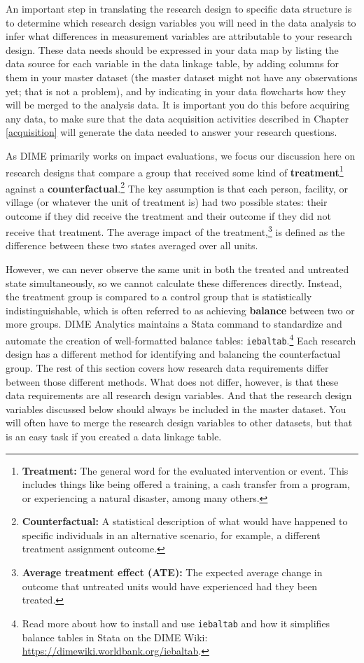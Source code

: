 \documentclass[
]{book}
\begin{document}
An important step in translating the research design to specific data
structure is to determine which research design variables you will need in the data analysis
to infer what differences in measurement variables
are attributable to your research design.
These data needs should be expressed in your data map by
listing the data source for each variable in the data linkage table,
by adding columns for them in your master dataset
(the master dataset might not have any observations yet; that is not a problem),
and by indicating in your data flowcharts how they will be merged to the analysis data.
It is important you do this before acquiring any data,
to make sure that the data acquisition activities described in Chapter \ref{acquisition}
will generate the data needed to answer your research questions.

As DIME primarily works on impact evaluations,
we focus our discussion here on research designs
that compare a group that received
some kind of \textbf{treatment}\footnote{\textbf{Treatment:} The general word for the evaluated intervention or event.
  This includes things like being offered a training,
  a cash transfer from a program,
  or experiencing a natural disaster, among many others.}
against a \textbf{counterfactual}.\footnote{\textbf{Counterfactual:} A statistical description of
  what would have happened
  to specific individuals in an alternative scenario,
  for example, a different treatment assignment outcome.}
The key assumption is that each
person, facility, or village
(or whatever the unit of treatment is)
had two possible states: their outcome if they did receive the treatment
and their outcome if they did not receive that treatment.
The average impact of the treatment,\footnote{\textbf{Average treatment effect (ATE):}
  The expected average change in outcome
  that untreated units would have experienced
  had they been treated.}
is defined as the difference
between these two states averaged over all units.

However, we can never observe the same unit
in both the treated and untreated state simultaneously,
so we cannot calculate these differences directly.
Instead, the treatment group is compared to a control group
that is statistically indistinguishable,
which is often referred to as achieving
\textbf{balance} between two or more groups.
DIME Analytics maintains a Stata command to
standardize and automate the creation of well-formatted balance tables:
\texttt{iebaltab}.\footnote{Read more about how to install and use \texttt{iebaltab}
  and how it simplifies balance tables in Stata on the DIME Wiki:
  \url{https://dimewiki.worldbank.org/iebaltab}.}
Each research design has a different method for
identifying and balancing the counterfactual group.
The rest of this section covers how research data requirements
differ between those different methods.
What does not differ, however,
is that these data requirements are all research design variables.
And that the research design variables discussed below
should always be included in the master dataset.
You will often have to merge
the research design variables to other datasets,
but that is an easy task
if you created a data linkage table.
\end{document}
